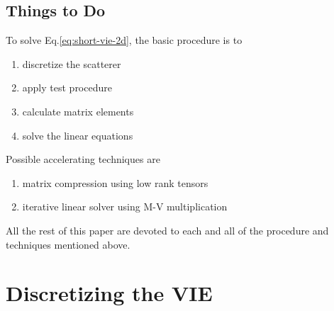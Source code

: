 \documentclass [10pt,letterpaper]{article}
\begin{document}
\subsection{Things to Do}
\label{sub:things-to-do}

To solve Eq.\eqref{eq:short-vie-2d}, the basic procedure is to
\begin{enumerate}
	\item discretize the scatterer
	\item apply test procedure
	\item calculate matrix elements
	\item solve the linear equations 
\end{enumerate}
Possible accelerating techniques are
\begin{enumerate}
	\setcounter{enumi} 4
	\item matrix compression using low rank tensors
	\item iterative linear solver using M-V multiplication
\end{enumerate}
All the rest of this paper are devoted to each and all of the procedure and techniques mentioned above.


\section{Discretizing the VIE}
\label{sec:discretizing-the-vie}
\end{document}
